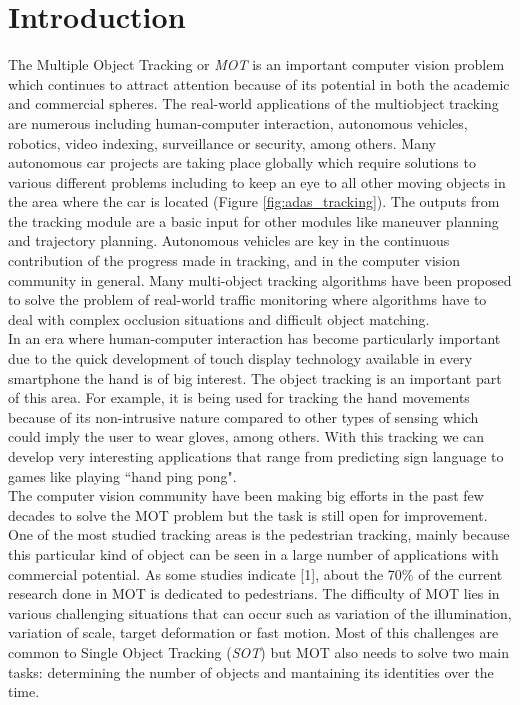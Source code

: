 \chapter{Introduction}\label{cap.introduccion}

\setlength{\parindent}{0pt}
The Multiple Object Tracking or \textit{MOT} is an important computer vision problem which continues to attract attention because of its potential in both the academic and commercial spheres. The real-world applications of the multiobject tracking are numerous including human-computer interaction, autonomous vehicles, robotics, video indexing, surveillance or security, among others. Many autonomous car projects are taking place globally which require solutions to various different problems including to keep an eye to all other moving objects in the area where the car is located (Figure \ref{fig:adas_tracking}). The outputs from the tracking module are a basic input for other modules like maneuver planning and trajectory planning. Autonomous vehicles are key in the continuous contribution of the progress made in tracking, and in the computer vision community in general. Many multi-object tracking algorithms have been proposed to solve the problem of real-world traffic monitoring where algorithms have to deal with complex occlusion situations and difficult object matching.\\
In an era where human-computer interaction has become particularly important due to the quick development of touch display technology available in every smartphone the hand is of big interest. The object tracking is an important part of this area. For example, it is being used for tracking the hand movements because of its non-intrusive nature compared to other types of sensing which could imply the user to wear gloves, among others. With this tracking we can develop very interesting applications that range from predicting sign language to games like playing ``hand ping pong".
\\
The computer vision community have been making big efforts in the past few decades to solve the MOT problem but the task is still open for improvement. One of the most studied tracking areas is the pedestrian tracking, mainly because this particular kind of object can be seen in a large number of applications with commercial potential. As some studies indicate [1], about the 70\% of the current research done in MOT is dedicated to pedestrians. The difficulty of MOT lies in various challenging situations that can occur such as variation of the illumination, variation of scale, target deformation or fast motion. Most of this challenges are common to Single Object Tracking (\textit{SOT}) but MOT also needs to solve two main tasks: determining the number of objects and mantaining its identities over the time.\\
